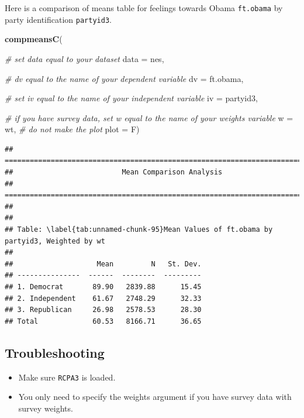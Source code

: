 \documentclass[
]{book}
\newenvironment{Shaded}{\begin{snugshade}}{\end{snugshade}}
\newcommand{\AttributeTok}[1]{\textcolor[rgb]{0.13,0.29,0.53}{#1}}
\newcommand{\CommentTok}[1]{\textcolor[rgb]{0.56,0.35,0.01}{\textit{#1}}}
\newcommand{\FunctionTok}[1]{\textcolor[rgb]{0.13,0.29,0.53}{\textbf{#1}}}
\newcommand{\NormalTok}[1]{#1}
\providecommand{\tightlist}{%
  \setlength{\itemsep}{0pt}\setlength{\parskip}{0pt}}
\begin{document}
Here is a comparison of means table for feelings towards Obama \texttt{ft.obama} by party identification \texttt{partyid3}.

\begin{Shaded}
\begin{Highlighting}[]
\FunctionTok{compmeansC}\NormalTok{(}
  
  \CommentTok{\# set \textasciigrave{}data\textasciigrave{} equal to your dataset}
  \AttributeTok{data =}\NormalTok{ nes,}
  
  \CommentTok{\# \textasciigrave{}dv\textasciigrave{} equal to the name of your dependent variable}
  \AttributeTok{dv =}\NormalTok{ ft.obama, }
  
  \CommentTok{\# set \textasciigrave{}iv\textasciigrave{} equal to the name of your independent variable}
  \AttributeTok{iv =}\NormalTok{ partyid3, }
  
  \CommentTok{\# if you have survey data, set \textasciigrave{}w\textasciigrave{} equal to the name of your weights variable}
  \AttributeTok{w =}\NormalTok{ wt,}
  \CommentTok{\# do not make the plot}
  \AttributeTok{plot =}\NormalTok{ F)}
\end{Highlighting}
\end{Shaded}

\begin{verbatim}
## ===========================================================================
##                          Mean Comparison Analysis
## ===========================================================================
## 
## 
## Table: \label{tab:unnamed-chunk-95}Mean Values of ft.obama by partyid3, Weighted by wt
## 
##                    Mean         N   St. Dev.
## ---------------  ------  --------  ---------
## 1. Democrat       89.90   2839.88      15.45
## 2. Independent    61.67   2748.29      32.33
## 3. Republican     26.98   2578.53      28.30
## Total             60.53   8166.71      36.65
\end{verbatim}

\hypertarget{troubleshooting-37}{%
\subsection{Troubleshooting}\label{troubleshooting-37}}

\begin{itemize}
\tightlist
\item
  Make sure \texttt{RCPA3} is loaded.
\item
  You only need to specify the weights argument if you have survey data with survey weights.
\end{itemize}
\end{document}
